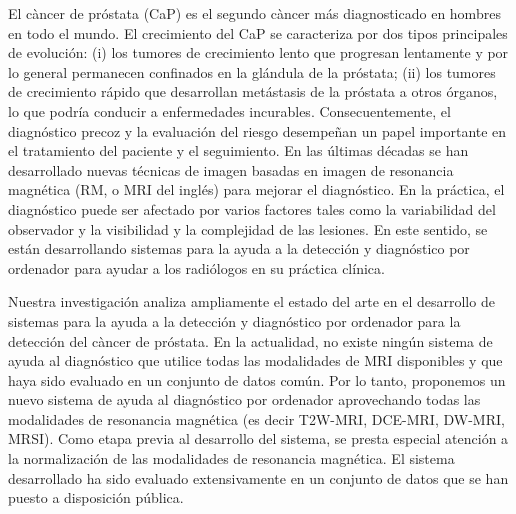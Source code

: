 \begin{abstractSpanish}

El c\`ancer de pr\'ostata (CaP) es el segundo c\`ancer m\'as diagnosticado en hombres en todo el mundo.
El crecimiento del CaP se caracteriza por dos tipos principales de evoluci\'on: (i) los tumores de crecimiento lento que progresan lentamente y por lo general permanecen confinados en la gl\'andula de la pr\'ostata; (ii) los tumores de crecimiento r\'apido que desarrollan met\'astasis de la pr\'ostata a otros \'organos, lo que podr\'ia conducir a enfermedades incurables.
Consecuentemente, el diagn\'ostico precoz y la evaluaci\'on del riesgo desempe\~nan un papel importante en el tratamiento del paciente y el seguimiento. En las \'ultimas d\'ecadas se han desarrollado  nuevas t\'ecnicas de imagen basadas en imagen de resonancia magn\'etica (RM, o MRI del ingl\'es) para mejorar el diagn\'ostico. En la pr\'actica, el diagn\'ostico puede ser afectado por varios factores tales como la variabilidad del observador y la visibilidad y la complejidad de las lesiones.
En este sentido, se est\'an desarrollando sistemas para la ayuda a la detecci\'on y diagnóstico por ordenador para ayudar a los radi\'ologos en su pr\'actica cl\'inica.

Nuestra investigaci\'on analiza ampliamente el estado del arte en el desarrollo de sistemas para la ayuda a la detecci\'on y diagn\'ostico por ordenador para la detecci\'on del c\`ancer de pr\'ostata.
En la actualidad, no existe ning\'un sistema de ayuda al diagn\'ostico que utilice todas las modalidades de MRI disponibles y que haya sido evaluado en un conjunto de datos com\'un.
Por lo tanto, proponemos un nuevo sistema de ayuda al diagn\'ostico por ordenador aprovechando todas las modalidades de resonancia magnética (es decir T2W-MRI, DCE-MRI, DW-MRI, MRSI).
Como etapa previa al desarrollo del sistema, se presta especial atenci\'on a la normalizaci\'on de las modalidades de resonancia magn\'etica.
El sistema desarrollado ha sido evaluado extensivamente en un conjunto de datos que se han puesto a disposici\'on p\'ublica.
 
\end{abstractSpanish}

